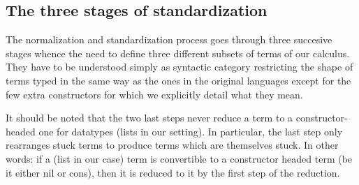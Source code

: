 \subsection{The three stages of standardization}
\label{bigstep}
The normalization and standardization process goes through three succesive stages
whence the need to define three different subsets of terms of our calculus. They
have to be understood simply as syntactic category restricting the shape of terms
typed in the same way as the ones in the original languages except for the few
extra constructors for which we explicitly detail what they mean.

\begin{remark}It should be noted that the two last steps never reduce a term to
a constructor-headed one for datatypes (lists in our setting). In particular,
the last step only rearranges stuck terms to produce terms which are themselves
stuck. In other words: if a (list in our case) term is convertible to a constructor
headed term (be it either nil or cons), then it is reduced to it by the first step
of the reduction.
\end{remark}

